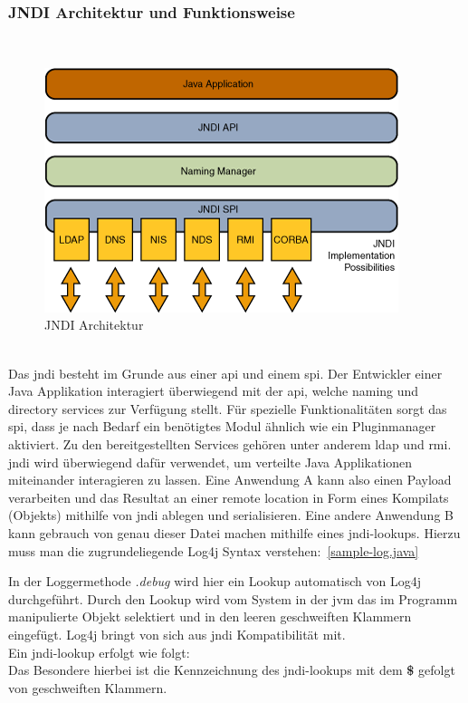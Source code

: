 \subsubsection{JNDI Architektur und Funktionsweise}
\\
\begin{figure}[!htb] %
    \begin{center}
        \includegraphics[scale=0.75]{images/jndiarch}
    \end{center}
    \caption{JNDI Architektur}
\end{figure}
\\
Das \gls{jndi} besteht im Grunde aus einer \gls{api} und einem \gls{spi}. Der Entwickler einer Java Applikation interagiert überwiegend mit der \gls{api}, welche
naming und directory services zur Verfügung stellt. Für spezielle Funktionalitäten sorgt das \gls{spi}, dass je nach Bedarf ein benötigtes Modul ähnlich wie ein Pluginmanager
aktiviert. Zu den bereitgestellten Services gehören unter anderem \gls{ldap} und \gls{rmi}. \gls{jndi} wird
überwiegend dafür verwendet, um verteilte Java Applikationen miteinander interagieren zu lassen. Eine Anwendung A kann also einen Payload verarbeiten und
das Resultat an einer remote location in Form eines Kompilats (Objekts) mithilfe von \gls{jndi} ablegen und serialisieren. Eine andere Anwendung B kann gebrauch von genau
dieser Datei machen mithilfe eines \gls{jndi}-lookups.\clearpage
Hierzu muss man die zugrundeliegende Log4j Syntax verstehen:~\ref{sample-log.java}


In der Loggermethode \textit{.debug} wird hier ein Lookup automatisch von Log4j durchgeführt. Durch den Lookup wird vom System in der \gls{jvm} das im Programm
manipulierte Objekt selektiert und in den leeren geschweiften Klammern eingefügt. Log4j bringt von sich aus \gls{jndi} Kompatibilität mit.\\

Ein \gls{jndi}-lookup erfolgt wie folgt:
\\

Das Besondere hierbei ist die Kennzeichnung des \gls{jndi}-lookups mit dem \textbf{\$} gefolgt von geschweiften Klammern.